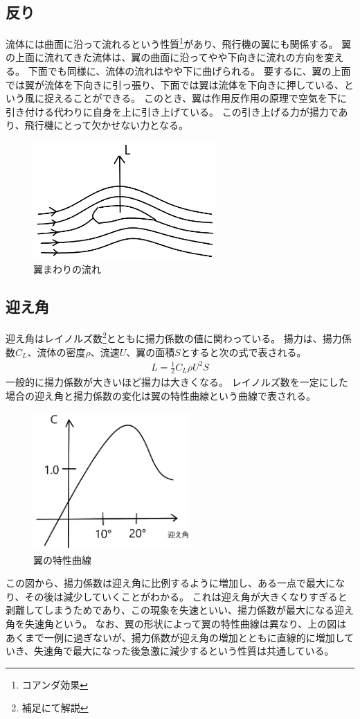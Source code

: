 \documentclass[10pt,b5paper,papersize,dvipdfmx]{jsbook}
\begin{document}
\subsection{反り}
流体には曲面に沿って流れるという性質\footnote{コアンダ効果}があり、飛行機の翼にも関係する。
翼の上面に流れてきた流体は、翼の曲面に沿ってやや下向きに流れの方向を変える。
下面でも同様に、流体の流れはやや下に曲げられる。
要するに、翼の上面では翼が流体を下向きに引っ張り、下面では翼は流体を下向きに押している、という風に捉えることができる。
このとき、翼は作用反作用の原理で空気を下に引き付ける代わりに自身を上に引き上げている。
この引き上げる力が揚力であり、飛行機にとって欠かせない力となる。
\begin{figure}[ht]
  \centering
  \includegraphics[width=70mm]{img/ryuutai7.png}
  \caption{翼まわりの流れ}
\end{figure}

\subsection{迎え角}
迎え角はレイノルズ数\footnote{補足にて解説}とともに揚力係数の値に関わっている。
揚力は、揚力係数$C_L$、流体の密度$\rho $、流速$U$、翼の面積$S$とすると次の式で表される。
\begin{align}
  L = \frac{1}{2}C_L\rho U^2S
\end{align}
一般的に揚力係数が大きいほど揚力は大きくなる。
レイノルズ数を一定にした場合の迎え角と揚力係数の変化は翼の特性曲線という曲線で表される。
\par
\begin{figure}[ht]
  \centering
  \includegraphics[width=60mm]{img/ryuutai8.png}
  \caption{翼の特性曲線}
\end{figure}
この図から、揚力係数は迎え角に比例するように増加し、ある一点で最大になり、その後は減少していくことがわかる。
これは迎え角が大きくなりすぎると剥離してしまうためであり、この現象を失速といい、揚力係数が最大になる迎え角を失速角という。
なお、翼の形状によって翼の特性曲線は異なり、上の図はあくまで一例に過ぎないが、揚力係数が迎え角の増加とともに直線的に増加していき、失速角で最大になった後急激に減少するという性質は共通している。
\end{document}
